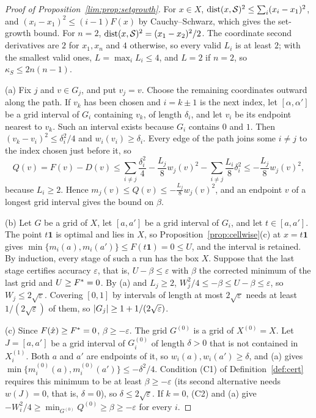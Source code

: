 \begin{proof}[Proof of Proposition~\ref{lim:prop:setgrowth}]
For $x\in X$, $\operatorname{dist}(x,\mathcal S)^2\le\sum_i(x_i-x_1)^2$, and
$(x_i-x_1)^2\le(i-1)F(x)$ by Cauchy--Schwarz, which gives the set-growth
bound. For $n=2$, $\operatorname{dist}(x,\mathcal S)^2=(x_1-x_2)^2/2$. The coordinate second
derivatives are $2$ for $x_1,x_n$ and $4$ otherwise, so every valid $L_i$ is
at least $2$; with the smallest valid ones, $L=\max_iL_i\le4$, and $L=2$ if
$n=2$, so $\kappa_S\le2n(n-1)$.

(a) Fix $j$ and $v\in G_j$, and put $v_j=v$. Choose the remaining coordinates
outward along the path. If $v_k$ has been chosen and $i=k\pm1$ is the next
index, let $[\alpha,\alpha']$ be a grid interval of $G_i$ containing $v_k$, of
length $\delta_i$, and let $v_i$ be its endpoint nearest to $v_k$. Such an
interval exists because $G_i$ contains $0$ and $1$. Then
$(v_k-v_i)^2\le\delta_i^2/4$ and $w_i(v_i)\ge\delta_i$. Every edge of the
path joins some $i\ne j$ to the index chosen just before it, so
\[
Q(v)=F(v)-D(v)\le\sum_{i\ne j}\frac{\delta_i^2}4-\frac{L_j}8w_j(v)^2
-\sum_{i\ne j}\frac{L_i}8\delta_i^2\le-\frac{L_j}8w_j(v)^2,
\]
because $L_i\ge2$. Hence $m_j(v)\le Q(v)\le-\frac{L_j}8w_j(v)^2$, and an
endpoint $v$ of a longest grid interval gives the bound on $\beta$.

(b) Let $G$ be a grid of $X$, let $[a,a']$ be a grid interval of $G_i$, and
let $t\in[a,a']$. The point $t\mathbf1$ is optimal and lies in $X$, so
Proposition~\ref{prop:cellwise}(c) at $x=t\mathbf1$ gives
$\min\{m_i(a),m_i(a')\}\le F(t\mathbf1)=0\le U$, and the interval is
retained. By induction, every stage of such a run has the box $X$. Suppose that the
last stage certifies accuracy $\varepsilon$, that is, $U-\beta\le\varepsilon$
with $\beta$ the corrected minimum of the last grid and $U\ge F^{*}=0$. By (a)
and $L_j\ge2$, $W_j^2/4\le-\beta\le U-\beta\le\varepsilon$, so
$W_j\le2\sqrt\varepsilon$. Covering $[0,1]$ by intervals of length at most
$2\sqrt\varepsilon$ needs at least $1/(2\sqrt\varepsilon)$ of them, so
$\lvert G_j\rvert\ge1+1/(2\sqrt\varepsilon)$.

(c) Since $F(\hat x)\ge F^{*}=0$, $\beta\ge-\varepsilon$. The grid $G^{(0)}$ is
a grid of $X^{(0)}=X$. Let $J=[a,a']$ be a grid interval of $G^{(0)}_i$ of
length $\delta>0$ that is not contained in $X^{(1)}_i$. Both $a$ and $a'$ are
endpoints of it, so $w_i(a),w_i(a')\ge\delta$, and (a) gives
$\min\{m^{(0)}_i(a),m^{(0)}_i(a')\}\le-\delta^2/4$. Condition (C1) of
Definition~\ref{def:cert} requires this minimum to be at least
$\beta\ge-\varepsilon$ (its second alternative needs $w(J)=0$, that is,
$\delta=0$), so $\delta\le2\sqrt\varepsilon$. If $k=0$, (C2) and (a) give
$-W_i^2/4\ge\min_{G^{(0)}}Q^{(0)}\ge\beta\ge-\varepsilon$ for every $i$.
\end{proof}

